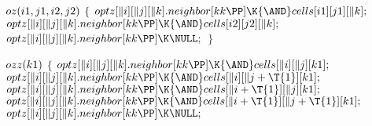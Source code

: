 \B\D$\\{oz}(\\{i1},\\{j1},\\{i2},\\{j2})$ \6
${}\{{}$\1\6
${}\\{optz}[\|i][\|j][\|k].\\{neighbor}[\\{kk}\PP]\K{\AND}\\{cells}[\\{i1}][%
\\{j1}][\|k];{}$\6
${}\\{optz}[\|i][\|j][\|k].\\{neighbor}[\\{kk}\PP]\K{\AND}\\{cells}[\\{i2}][%
\\{j2}][\|k];{}$\6
${}\\{optz}[\|i][\|j][\|k].\\{neighbor}[\\{kk}\PP]\K\NULL;{}$\6
\4${}\}{}$\2\par
\B\4\D$\\{ozz}(\\{k1})$ \6
${}\{{}$\1\6
${}\\{optz}[\|i][\|j][\|k].\\{neighbor}[\\{kk}\PP]\K{\AND}\\{cells}[\|i][\|j][%
\\{k1}];{}$\6
${}\\{optz}[\|i][\|j][\|k].\\{neighbor}[\\{kk}\PP]\K{\AND}\\{cells}[\|i][\|j+%
\T{1}][\\{k1}];{}$\6
${}\\{optz}[\|i][\|j][\|k].\\{neighbor}[\\{kk}\PP]\K{\AND}\\{cells}[\|i+\T{1}][%
\|j][\\{k1}];{}$\6
${}\\{optz}[\|i][\|j][\|k].\\{neighbor}[\\{kk}\PP]\K{\AND}\\{cells}[\|i+\T{1}][%
\|j+\T{1}][\\{k1}];{}$\6
${}\\{optz}[\|i][\|j][\|k].\\{neighbor}[\\{kk}\PP]\K\NULL;{}$\6
